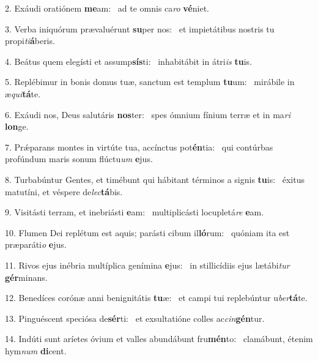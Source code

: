 2. Exáudi oratiónem \textbf{me}am: \ast\  ad te omnis ca\textit{ro} \textbf{vé}niet.\

3. Verba iniquórum prævaluérunt \textbf{su}per nos: \ast\  et impietátibus nostris tu propi\textit{ti}\textbf{á}beris.\

4. Beátus quem elegísti et assump\textbf{sís}ti: \ast\  inhabitábit in átri\textit{is} \textbf{tu}is.\

5. Replébimur in bonis domus tuæ, sanctum est templum \textbf{tu}um: \ast\  mirábile in æ\textit{qui}\textbf{tá}te.\

6. Exáudi nos, Deus salutáris \textbf{nos}ter: \ast\  spes ómnium fínium terræ et in ma\textit{ri} \textbf{lon}ge.\

7. Prǽparans montes in virtúte tua, accínctus pot\textbf{én}tia: \ast\  qui contúrbas profúndum maris sonum flúctu\textit{um} \textbf{e}jus.\

8. Turbabúntur Gentes, et timébunt qui hábitant términos a signis \textbf{tu}is: \ast\  éxitus matutíni, et véspere de\textit{lec}\textbf{tá}bis.\

9. Visitásti terram, et inebriásti \textbf{e}am: \ast\  multiplicásti locupletá\textit{re} \textbf{e}am.\

10. Flumen Dei replétum est aquis; parásti cibum il\textbf{ló}rum: \ast\  quóniam ita est præparáti\textit{o} \textbf{e}jus.\

11. Rivos ejus inébria multíplica genímina \textbf{e}jus: \ast\  in stillicídiis ejus lætábi\textit{tur} \textbf{gér}minans.\

12. Benedíces corónæ anni benignitátis \textbf{tu}æ: \ast\  et campi tui replebúntur u\textit{ber}\textbf{tá}te.\

13. Pinguéscent speciósa de\textbf{sér}ti: \ast\  et exsultatióne colles ac\textit{cin}\textbf{gén}tur.\

14. Indúti sunt aríetes óvium et valles abundábunt fru\textbf{mén}to: \ast\  clamábunt, étenim hym\textit{num} \textbf{di}cent.\

